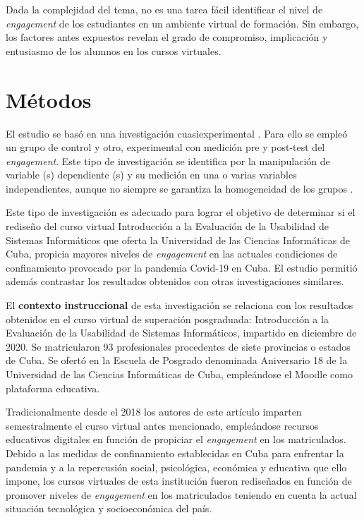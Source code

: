 \documentclass{textolivre}
\begin{document}
Dada la complejidad del tema, no es una tarea fácil identificar el nivel de \emph{engagement} de los estudiantes en un ambiente virtual de formación. Sin embargo, los factores antes expuestos revelan el grado de compromiso, implicación y entusiasmo de los alumnos en los cursos virtuales.

\section{Métodos}
El estudio se basó en una investigación cuasiexperimental \cite{gopalan2020}. %
Para ello se empleó un grupo de control y otro, experimental con medición pre y post-test del \emph{engagement}. Este tipo de investigación \cite{pulidoguerrero2020} %
se identifica por la manipulación de variable (s) dependiente (s) y su medición en una o varias variables independientes, aunque no siempre se garantiza la homogeneidad de los grupos \cite{hernandezsampieri2014}. %

Este tipo de investigación es adecuado para lograr el objetivo de determinar si el rediseño del curso virtual Introducción a la Evaluación de la Usabilidad de Sistemas Informáticos que oferta la Universidad de las Ciencias Informáticas de Cuba, propicia mayores niveles de \emph{engagement} en las actuales condiciones de confinamiento provocado por la pandemia Covid-19 en Cuba. El estudio permitió además contrastar los resultados obtenidos con otras investigaciones similares.

El \textbf{contexto instruccional} de esta investigación se relaciona con los resultados obtenidos en el curso virtual de superación posgraduada: Introducción a la Evaluación de la Usabilidad de Sistemas Informáticos, impartido en diciembre de 2020. Se matricularon 93 profesionales procedentes de siete provincias o estados de Cuba. Se ofertó en la Escuela de Posgrado denominada Aniversario 18 de la Universidad de las Ciencias Informáticas de Cuba, empleándose el Moodle como plataforma educativa.

Tradicionalmente desde el 2018 los autores de este artículo imparten semestralmente el curso virtual antes mencionado, empleándose recursos educativos digitales en función de propiciar el \emph{engagement} en los matriculados. Debido a las medidas de confinamiento establecidas en Cuba para enfrentar la pandemia y a la repercusión social, psicológica, económica y educativa que ello impone, los cursos virtuales de esta institución fueron rediseñados en función de promover niveles de \emph{engagement} en los matriculados teniendo en cuenta la actual situación tecnológica y socioeconómica del país.
\end{document}
